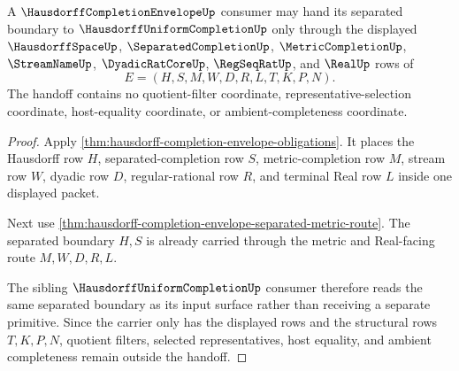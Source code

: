 \begin{theorem}
\label{thm:hausdorff-completion-envelope-sibling-route}
A $\HausdorffCompletionEnvelopeUp$ consumer may hand its separated boundary to $\HausdorffUniformCompletionUp$ only through the displayed $\HausdorffSpaceUp$, $\SeparatedCompletionUp$, $\MetricCompletionUp$, $\StreamNameUp$, $\DyadicRatCoreUp$, $\RegSeqRatUp$, and $\RealUp$ rows of
$$
E=(H,S,M,W,D,R,L,T,K,P,N).
$$
The handoff contains no quotient-filter coordinate, representative-selection coordinate, host-equality coordinate, or ambient-completeness coordinate.
\end{theorem}
\begin{proof}
Apply \autoref{thm:hausdorff-completion-envelope-obligations}. It places the Hausdorff row $H$, separated-completion row $S$, metric-completion row $M$, stream row $W$, dyadic row $D$, regular-rational row $R$, and terminal Real row $L$ inside one displayed packet.

Next use \autoref{thm:hausdorff-completion-envelope-separated-metric-route}. The separated boundary $H,S$ is already carried through the metric and Real-facing route $M,W,D,R,L$.

The sibling $\HausdorffUniformCompletionUp$ consumer therefore reads the same separated boundary as its input surface rather than receiving a separate primitive. Since the carrier only has the displayed rows and the structural rows $T,K,P,N$, quotient filters, selected representatives, host equality, and ambient completeness remain outside the handoff.
\end{proof}

